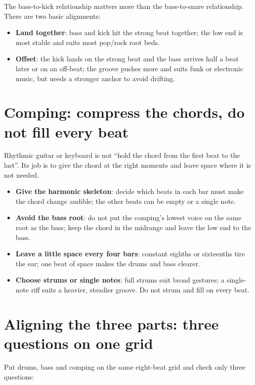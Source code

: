 The bass-to-kick relationship matters more than the bass-to-snare relationship. There are two basic alignments:

\begin{itemize}
\item \textbf{Land together}: bass and kick hit the strong beat together; the low end is most stable and suits most pop/rock root beds.
\item \textbf{Offset}: the kick lands on the strong beat and the bass arrives half a beat later or on an off-beat; the groove pushes more and suits funk or electronic music, but needs a stronger anchor to avoid drifting.
\end{itemize}

\section{Comping: compress the chords, do not fill every beat}
\label{sec:comping}

Rhythmic guitar or keyboard  is not ``hold the chord from the first beat to the last''. Its job is to give the chord at the right moments and leave space where it is not needed.

\begin{itemize}
\item \textbf{Give the harmonic skeleton}: decide which beats in each bar must make the chord change audible; the other beats can be empty or a single note.
\item \textbf{Avoid the bass root}: do not put the comping's lowest voice on the same root as the bass; keep the chord in the midrange and leave the low end to the bass.
\item \textbf{Leave a little space every four bars}: constant eighths or sixteenths tire the ear; one beat of space makes the drums and bass clearer.
\item \textbf{Choose strums or single notes}: full strums suit broad gestures; a single-note riff suits a heavier, steadier groove. Do not strum and fill on every beat.
\end{itemize}

\section{Aligning the three parts: three questions on one grid}
\label{sec:rhythm-align}

Put drums, bass and comping on the same eight-beat grid and check only three questions:

